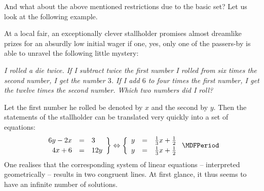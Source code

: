 \begin{MIntro}
And what about the above mentioned restrictions due to the basic set? 
Let us look at the following example.

\begin{MExample}
At a local fair, an exceptionally clever stallholder promises almost dreamlike prizes for an absurdly low initial wager if one, yes, only one of the passers-by is able to unravel the 
following little mystery:

\textit{I rolled a die twice. If I subtract twice the first number I rolled from six times
the second number, I get the number $3$. If I add $6$ to four times the first number, I get the twelve times the second number. Which two numbers did I roll?}

Let the first number he rolled be denoted by $x$ and the second by $y$. 
Then the statements of the stallholder can be translated very quickly into a set of equations:
$$\left. \begin{array}{rcl} 6 y - 2 x & = & 3 \\[.5ex] 4 x + 6 & = & 12 y \end{array} \right\} \Leftrightarrow
\left\{ \begin{array}{rcl} y & = & \Mtfrac13 x + \Mtfrac12 \\[.5ex]
y & = & \Mtfrac13 x + \Mtfrac12 \end{array} \right. \MDFPeriod $$
One realises that the corresponding system of linear equations -- interpreted geometrically -- 
results in two congruent lines. At first glance, it thus seems to have an infinite number
of solutions.


\end{MExample}
\end{MIntro}
